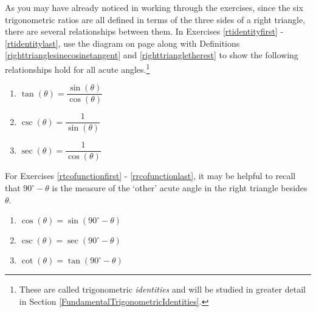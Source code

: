 As you may have already noticed in working through the exercises, since the six trigonometric ratios are all defined in terms of the three sides of a right triangle, there are several relationships between them.  In Exercises \ref{rtidentityfirst} - \ref{rtidentitylast}, use the diagram on page \pageref{righttranglediagram} along with Definitions \ref{righttrianglesinecosinetangent} and \ref{righttriangletherest} to show the following relationships hold for all acute angles.\footnote{These are called trigonometric \textit{identities} and will be studied in greater detail in Section \ref{FundamentalTrigonometricIdentities}.}

\begin{multicols}{3}

\begin{enumerate}

\setcounter{enumi}{\value{HW}}

\item  $\tan(\theta) = \dfrac{\sin(\theta)}{\cos(\theta)}$ \label{rtidentityfirst}

\item  $\csc(\theta) = \dfrac{1}{\sin(\theta)}$

\item  $\sec(\theta) = \dfrac{1}{\cos(\theta)}$

\setcounter{HW}{\value{enumi}}

\end{enumerate}

\end{multicols}

For Exercises \ref{rtcofunctionfirst} - \ref{rrcofunctionlast}, it may be helpful to recall that $90^{\circ} - \theta$ is the measure of the `other' acute angle in the right triangle besides $\theta$.


\begin{multicols}{3}

\begin{enumerate}

\setcounter{enumi}{\value{HW}}

\item  $\cos(\theta) = \sin\left( 90^{\circ} - \theta \right) $ \label{rtcofunctionfirst} \label{cofunctionforeshadowing}

\item  $\csc(\theta) = \sec\left( 90^{\circ} - \theta \right) $

\item  $\cot(\theta) = \tan\left( 90^{\circ} - \theta \right) $ \label{rrcofunctionlast}

\setcounter{HW}{\value{enumi}}

\end{enumerate}

\end{multicols}


